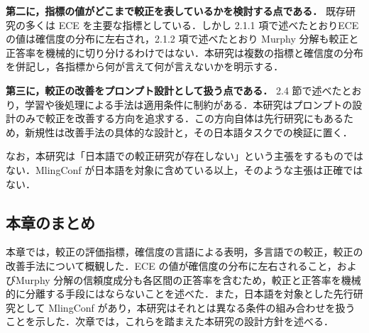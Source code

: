 \textbf{第二に，指標の値がどこまで較正を表しているかを検討する点である．} 既存研究の多くは ECE を主要な指標としている．しかし 2.1.1 項で述べたとおりECE の値は確信度の分布に左右され，2.1.2 項で述べたとおり Murphy 分解も較正と正答率を機械的に切り分けるわけではない．本研究は複数の指標と確信度の分布を併記し，各指標から何が言えて何が言えないかを明示する．

\textbf{第三に，較正の改善をプロンプト設計として扱う点である．} 2.4 節で述べたとおり，学習や後処理による手法は適用条件に制約がある．本研究はプロンプトの設計のみで較正を改善する方向を追求する．この方向自体は先行研究にもあるため，新規性は改善手法の具体的な設計と，その日本語タスクでの検証に置く．

なお，本研究は「日本語での較正研究が存在しない」という主張をするものではない．MlingConf が日本語を対象に含めている以上，そのような主張は正確ではない．

\subsection{本章のまとめ}

本章では，較正の評価指標，確信度の言語による表明，多言語での較正，較正の改善手法について概観した．ECE の値が確信度の分布に左右されること，およびMurphy 分解の信頼度成分も各区間の正答率を含むため，較正と正答率を機械的に分離する手段にはならないことを述べた．また，日本語を対象とした先行研究として MlingConf があり，本研究はそれとは異なる条件の組み合わせを扱うことを示した．次章では，これらを踏まえた本研究の設計方針を述べる．
